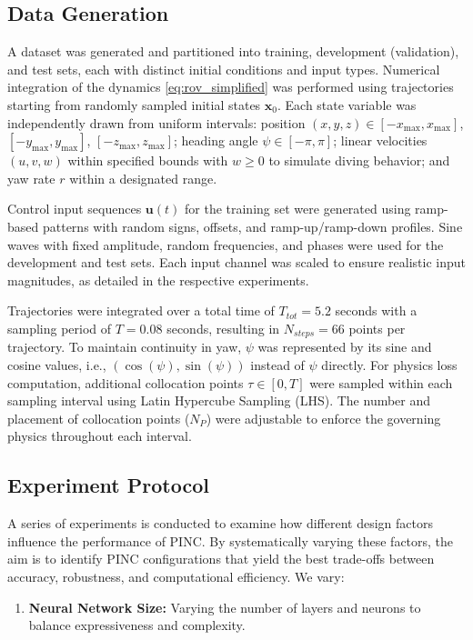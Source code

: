 \documentclass[conference]{IEEEtran}
\begin{document}
{\subsection{Data Generation}
A dataset was generated and partitioned into training, development (validation), and test sets, each with distinct initial conditions and input types. Numerical integration of the dynamics \eqref{eq:rov_simplified} was performed using trajectories starting from randomly sampled initial states $\bm{x}_0$. Each state variable was independently drawn from uniform intervals: position $(x, y, z) \in [-x_{\max}, x_{\max}]$, $[-y_{\max}, y_{\max}]$, $[-z_{\max}, z_{\max}]$; heading angle $\psi \in [-\pi, \pi]$; linear velocities $(u, v, w)$ within specified bounds with $w \geq 0$ to simulate diving behavior; and yaw rate $r$ within a designated range.

Control input sequences $\mathbf{u}(t)$ for the training set were generated using ramp-based patterns with random signs, offsets, and ramp-up/ramp-down profiles. Sine waves with fixed amplitude, random frequencies, and phases were used for the development and test sets. Each input channel was scaled to ensure realistic input magnitudes, as detailed in the respective experiments.

Trajectories were integrated over a total time of $T_{tot}=5.2$ seconds with a sampling period of $T=0.08$ seconds, resulting in $N_{steps}=66$ points per trajectory. To maintain continuity in yaw, $\psi$ was represented by its sine and cosine values, i.e., $(\cos(\psi), \sin(\psi))$ instead of $\psi$ directly. For physics loss computation, additional collocation points $\tau \in [0, T]$ were sampled within each sampling interval using Latin Hypercube Sampling (LHS). The number and placement of collocation points ($N_P$) were adjustable to enforce the governing physics throughout each interval.

\subsection{Experiment Protocol}
A series of experiments is conducted to examine how different design factors influence the performance of PINC. By systematically varying these factors, the aim is to identify PINC configurations that yield the best trade-offs between accuracy, robustness, and computational efficiency. We vary:
\begin{enumerate}

    \item \textbf{Neural Network Size:} 
        Varying the number of layers and neurons to balance expressiveness and complexity.
    

\end{enumerate}}
\end{document}
